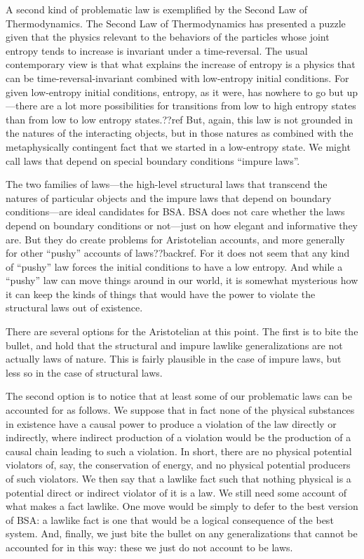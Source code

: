 A second kind of problematic law is exemplified by the Second Law of Thermodynamics. The Second Law of Thermodynamics
has presented a puzzle given that the physics relevant to the behaviors of the particles whose joint entropy tends to increase
is invariant under a time-reversal. The usual contemporary view is that what explains the increase of entropy is a physics
that can be time-reversal-invariant combined with low-entropy initial conditions. For given low-entropy initial conditions,
entropy, as it were, has nowhere to go but up---there are a lot more possibilities for transitions from low to high entropy states
than from low to low entropy states.??ref But, again, this law is not grounded in the natures of the interacting objects, 
but in those natures as combined with the metaphysically contingent fact that we started in a low-entropy state.  We might 
call laws that depend on special boundary conditions ``impure laws''. 

The two families of laws---the high-level structural laws that transcend the natures of particular objects and the impure
laws that depend on boundary conditions---are ideal candidates for BSA. BSA does not care whether the laws depend on boundary
conditions or not---just on how elegant and informative they are. But they do create problems for Aristotelian accounts, 
and more generally for other ``pushy'' accounts of laws??backref. For it does not seem that any kind of ``pushy'' law 
forces the initial conditions to have a low entropy. And while a ``pushy'' law can move things around in our world, it is
somewhat mysterious how it can keep the kinds of things that would have the power to violate the structural laws out of 
existence.

There are several options for the Aristotelian at this point. The first is to bite the bullet, and hold that the structural
and impure lawlike generalizations are not actually laws of nature. This is fairly plausible in the case of impure laws, but
less so in the case of structural laws. 

The second option is to notice that at least some of our problematic laws can be accounted for as follows. We
suppose that in fact none of the physical substances in existence have a causal power to produce a violation of the law directly
or indirectly, where indirect production of a violation would be the production of a causal chain leading to such a violation.
In short, there are no physical potential violators of, say, the conservation of energy, and no physical potential producers of 
such violators. We then say that a lawlike fact such that nothing physical is a potential direct or indirect violator of it is a 
law. We still need some account of what makes a fact lawlike. One move would be simply to defer to the best version of BSA: a lawlike
fact is one that would be a logical consequence of the best system. And, finally, we just bite the bullet on any generalizations that
cannot be accounted for in this way: these we just do not account to be laws.

